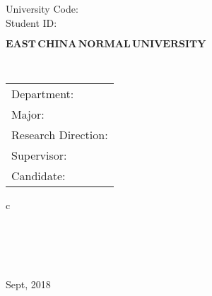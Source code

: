 

\pagestyle{empty}

\hskip 1.83cm {\large University Code: \qquad {}}\\
\hspace*{\fill} {\large Student ID: }

\vskip 2cm

\begin{center}
{\Huge $\mathbf{EAST}\,\mathbf{CHINA}\,\mathbf{NORMAL}\,
\mathbf{UNIVERSITY}$}
\end{center}

\vskip 3cm

\begin{center}
\bfseries{\scshape{\huge \TheisNameEn
}}\\
\end{center}

\vskip 2cm {\large
\begin{center}
\begin{tabular}{l}
Department:\\
Major:\\ 
Research Direction:\\
Supervisor:\\
Candidate:
\end{tabular}
\begin{tabular}c
\normalsize{}\\
\hline ~~~  \\
\hline ~~~\\
\hline ~~~ \\
\hline ~~~  \\
\hline
\end{tabular}
\end{center}}

\vskip 30mm

\begin{center}
{\Large Sept, 2018}
\end{center}
